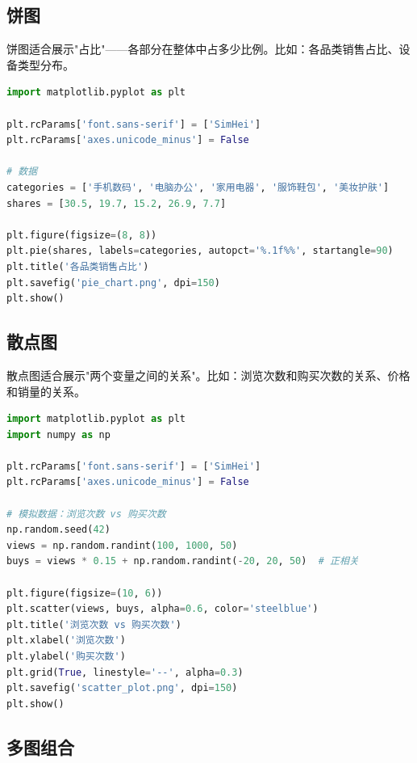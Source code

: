 \documentclass[12pt,a4paper]{article}
\begin{document}
\subsection{饼图}

\begin{theorybox}[饼图适合什么场景？]
饼图适合展示"占比"——各部分在整体中占多少比例。比如：各品类销售占比、设备类型分布。
\end{theorybox}

\begin{lstlisting}[language=Python]
import matplotlib.pyplot as plt

plt.rcParams['font.sans-serif'] = ['SimHei']
plt.rcParams['axes.unicode_minus'] = False

# 数据
categories = ['手机数码', '电脑办公', '家用电器', '服饰鞋包', '美妆护肤']
shares = [30.5, 19.7, 15.2, 26.9, 7.7]

plt.figure(figsize=(8, 8))
plt.pie(shares, labels=categories, autopct='%.1f%%', startangle=90)
plt.title('各品类销售占比')
plt.savefig('pie_chart.png', dpi=150)
plt.show()
\end{lstlisting}

\subsection{散点图}

\begin{theorybox}[散点图适合什么场景？]
散点图适合展示"两个变量之间的关系"。比如：浏览次数和购买次数的关系、价格和销量的关系。
\end{theorybox}

\begin{lstlisting}[language=Python]
import matplotlib.pyplot as plt
import numpy as np

plt.rcParams['font.sans-serif'] = ['SimHei']
plt.rcParams['axes.unicode_minus'] = False

# 模拟数据：浏览次数 vs 购买次数
np.random.seed(42)
views = np.random.randint(100, 1000, 50)
buys = views * 0.15 + np.random.randint(-20, 20, 50)  # 正相关

plt.figure(figsize=(10, 6))
plt.scatter(views, buys, alpha=0.6, color='steelblue')
plt.title('浏览次数 vs 购买次数')
plt.xlabel('浏览次数')
plt.ylabel('购买次数')
plt.grid(True, linestyle='--', alpha=0.3)
plt.savefig('scatter_plot.png', dpi=150)
plt.show()
\end{lstlisting}

\subsection{多图组合}
\end{document}

